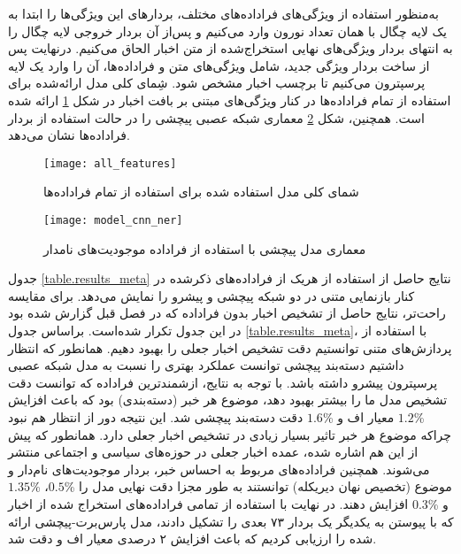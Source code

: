 به‌منظور استفاده از ویژگی‌های فراداده‌های مختلف،  بردار‌های این ویژگی‌ها را ابتدا به یک لایه چگال با همان تعداد نورون وارد می‌کنیم و پس‌از‌ آن بردار خروجی لایه چگال را به انتهای بردار ویژگی‌های نهایی استخراج‌شده از متن اخبار الحاق می‌کنیم. درنهایت پس‌ از ساخت بردار ویژگی جدید، شامل ویژگی‌های متن و فراداده‌ها، آن را وارد یک لایه پرسپترون می‌کنیم تا برچسب اخبار مشخص شود. شِمای کلی مدل ارائه‌شده برای استفاده از تمام فراداده‌ها در کنار ویژگی‌های مبتنی بر بافت اخبار در شکل \ref{fig.all_features} ارائه شده است. همچنین، شکل \ref{fig.cnn_ner}  معماری شبکه عصبی پیچشی را در حالت استفاده از بردار فراداده‌ها نشان می‌دهد. 

\begin{figure}[h!]
	\texttt{[image: all\_features]}
	\centering
	\caption{شمای کلی مدل استفاده شده برای استفاده از تمام فراداده‌ها}
	\label{fig.all_features}
\end{figure}

\begin{figure}[h!]
	\texttt{[image: model\_cnn\_ner]}
	\centering
	\caption{معماری مدل پیچشی با استفاده از فراداده موجودیت‌های نامدار}
	\label{fig.cnn_ner}
\end{figure}

جدول \ref{table.results_meta} نتایج حاصل از استفاده از هریک از فراداده‌های ذکرشده در کنار بازنمایی متنی  در دو شبکه پیچشی و پیشرو را نمایش می‌دهد. برای مقایسه راحت‌تر، نتایج حاصل از تشخیص اخبار بدون فراداده که در فصل قبل گزارش شده بود در این جدول تکرار شده‌است.
براساس جدول \ref{table.results_meta}، با استفاده از پردازش‌های متنی توانستیم دقت تشخیص اخبار جعلی را بهبود دهیم. همانطور که انتظار داشتیم دسته‌بند پیچشی توانست عملکرد بهتری را نسبت به مدل شبکه عصبی پرسپترون پیشرو داشته باشد. با توجه به نتایج، ازشمندترین فراداده که توانست دقت تشخیص مدل ما را بیشتر بهبود دهد، موضوع هر خبر (دسته‌بندی) بود که باعث افزایش \%$1.2$ معیار اف و \%$1.6$ دقت دسته‌بند پیچشی شد. این نتیجه دور از انتظار هم نبود چراکه موضوع هر خبر تاثیر بسیار زیادی در تشخیص اخبار جعلی دارد. همانطور که پیش از این هم اشاره شده، عمده اخبار جعلی در حوزه‌های سیاسی و اجتماعی منتشر می‌شوند. همچنین فراداده‌های مربوط به احساس‌ خبر، بردار موجودیت‌های نام‌د‌ار و موضوع (تخصیص نهان دیریکله) توانستند به طور مجزا دقت نهایی مدل را \%$0.5$، \%$1.35$ و \%$0.3$ افزایش دهند. در نهایت با استفاده از تمامی فراداده‌های استخراج شده از اخبار که با پیوستن به یکدیگر یک بردار ۷۳ بعدی را تشکیل دادند، مدل‌ پارس‌برت-پیچشی ارائه شده را ارزیابی کردیم که باعث افزایش ۲ درصدی معیار اف و دقت شد.

